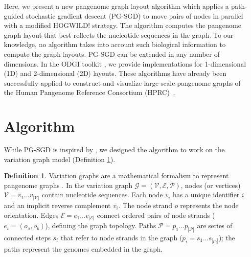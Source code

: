 \documentclass{bioinfo}
\theoremstyle{definition}
\newtheorem{definition}{Definition}[section]
\begin{document}
	Here, we present a new pangenome graph layout algorithm which applies a path-guided stochastic gradient descent (PG-SGD) to move pairs of nodes in parallel with a modified HOGWILD! strategy.
	The algorithm computes the pangenome graph layout that best reflects the nucleotide sequences in the graph.
	To our knowledge, no algorithm takes into account such biological information to compute the graph layouts.
	PG-SGD can be extended in any number of dimensions.
	In the ODGI toolkit \citep{Guarracino2022}, we provide implementations for 1-dimensional (1D) and 2-dimensional (2D) layouts.
	These algorithms have already been successfully applied to construct and visualize large-scale pangenome graphs of the Human Pangenome Reference Consortium (HPRC)~\citep{Liao2023, Guarracino2023}.

	\section{Algorithm}

	While PG-SGD is inspired by \cite{Zheng2019}, we designed the algorithm to work on the variation graph model (Definition \ref{def:vg}).
	
	\begin{definition}
		\label{def:vg}
		Variation graphs are a mathematical formalism to represent pangenome graphs \citep{Garrison_2019_thesis}.
		In the variation graph $\mathcal{G} = (\mathcal{V}, \mathcal{E}, \mathcal{P})$, nodes (or vertices) $\mathcal{V} = v_1\ldots v_{|\mathcal{V}|}$ contain nucleotide sequences.
		Each node $v_i$ has a unique identifier $i$ and an implicit reverse complement $\bar{v_i}$.
		The node strand $o$ represents the node orientation.
		Edges $\mathcal{E} = e_1\ldots e_{|\mathcal{E}|}$ connect ordered pairs of node strands ($e_i = ( o_a, o_b )$), defining the graph topology.
		Paths $\mathcal{P} = p_1\ldots p_{|\mathcal{P}|}$ are series of connected steps $s_i$ that refer to node strands in the graph ($p_i = s_1 \ldots s_{|p_i|}$); the paths represent the genomes embedded in the graph.
	\end{definition}
	
\end{document}
